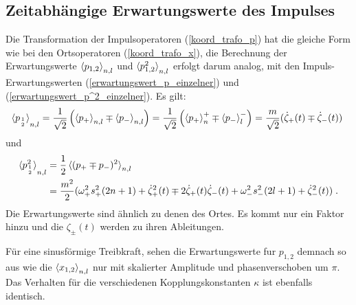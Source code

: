   \subsection{Zeitabhängige Erwartungswerte des Impulses}
    Die Transformation der Impulsoperatoren (\ref{koord_trafo_p}) hat die gleiche Form wie bei den Ortsoperatoren (\ref{koord_trafo_x}), die Berechnung der Erwartungswerte $\braket{p_{1,2}}_{n,l}$ und $\braket{p_{1,2}^2}_{n,l}$ erfolgt darum analog, mit den Impuls-Erwartungswerten (\ref{erwartungswert_p_einzelner}) und (\ref{erwartungswert_p^2_einzelner}).
    Es gilt:
    \begin{align}
      \braket{p_{1 \atop 2}}_{n,l}=\frac{1}{\sqrt{2}}\left(\braket{p_+}_{n,l}\mp\braket{p_-}_{n,l}\right)
      =\frac{1}{\sqrt{2}}\left(\braket{p_+}_n^+\mp\braket{p_-}_l^-\right)
      =\frac{m}{\sqrt{2}}(\dot\zeta_+(t)\mp\dot\zeta_-(t)) \;
    \end{align}
    und
    \begin{align}
      \braket{p^2_{1\atop 2}}_{n,l}&=\frac{1}{2}\braket{(p_+\mp p_-)^2}_{n,l}\notag\\ %
      &=\frac {m^2} 2 (\omega_+^2s_+^2(2n+1)+\dot\zeta_+^2(t) \mp 2\dot\zeta_+(t)\dot\zeta_-(t) + \omega_-^2s_-^2(2l+1)+\dot\zeta_-^2(t)) \; .
    \end{align}
    Die Erwartungswerte sind ähnlich zu denen des Ortes.
    Es kommt nur ein Faktor hinzu und die $\zeta_\pm(t)$ werden zu ihren Ableitungen.

    Für eine sinusförmige Treibkraft, sehen die Erwartungswerte fur $p_{1,2}$ demnach so aus wie die $\braket{x_{1,2}}_{n,l}$ nur mit skalierter Amplitude und phasenverschoben um $\pi$.
    Das Verhalten für die verschiedenen Kopplungskonstanten $\kappa$ ist ebenfalls identisch.

